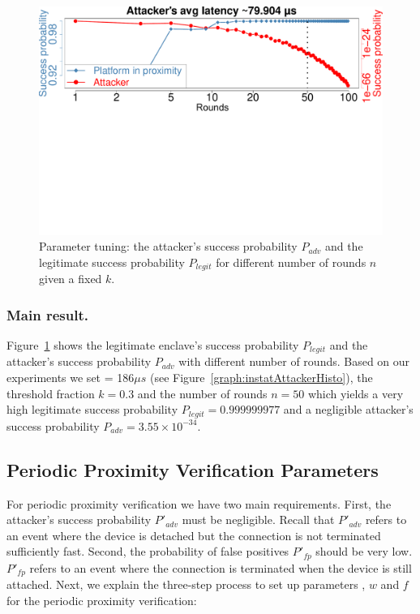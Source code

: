 \begin{figure}[h]
  \centering
    \includegraphics[trim={0 12.8cm 0 0}, clip, width=0.9\linewidth]{chapters/ProximiTEE/figures/InstantAttackerSuccess.pdf}
    \caption{Parameter tuning: the attacker's success probability $P_{adv}$ and the legitimate success probability $P_{legit}$ for different number of rounds $n$ given a fixed $k$.}

    \label{graph:instantAttackerSuccess}
\end{figure}


\subsubsection{Main result.} Figure~\ref{graph:instantAttackerSuccess} shows the legitimate enclave's success probability $P_{legit}$ and the attacker's success probability $P_{adv}$ with different number of rounds. Based on our experiments we set \connect= 186$\mu s$ (see Figure~\ref{graph:instatAttackerHisto}), the threshold fraction $k=0.3$ and the number of rounds $n=50$ which yields a very high legitimate success probability $P_{legit}=0.999999977$ and a negligible attacker's success probability $P_{adv}=3.55\times 10^{-34}$.





\subsection{Periodic Proximity Verification Parameters}
\label{sec:evaluationL:continuousParameters}


For periodic proximity verification we have two main requirements. First, the attacker's success probability $P'_{adv}$ must be negligible. Recall that $P'_{adv}$ refers to an event where the device is detached but the connection is not terminated sufficiently fast. Second, the probability of false positives $P'_{fp}$ should be very low. $P'_{fp}$ refers to an event where the connection is terminated when the device is still attached. Next, we explain the three-step process to set up parameters \detach, $w$ and $f$ for the periodic proximity verification:

